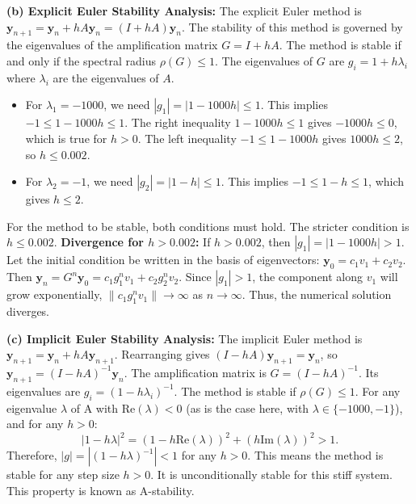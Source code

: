 \begin{solution}
\textbf{(b) Explicit Euler Stability Analysis:}
The explicit Euler method is $\mathbf{y}_{n+1} = \mathbf{y}_n + h A \mathbf{y}_n = (I + hA) \mathbf{y}_n$.
The stability of this method is governed by the eigenvalues of the amplification matrix $G = I + hA$. The method is stable if and only if the spectral radius $\rho(G) \leq 1$.
The eigenvalues of $G$ are $g_i = 1 + h\lambda_i$ where $\lambda_i$ are the eigenvalues of $A$.
\begin{itemize}
    \item For $\lambda_1 = -1000$, we need $|g_1| = |1 - 1000h| \leq 1$. This implies $-1 \leq 1 - 1000h \leq 1$.
    The right inequality $1 - 1000h \leq 1$ gives $-1000h \leq 0$, which is true for $h > 0$.
    The left inequality $-1 \leq 1 - 1000h$ gives $1000h \leq 2$, so $h \leq 0.002$.
    \item For $\lambda_2 = -1$, we need $|g_2| = |1 - h| \leq 1$. This implies $-1 \leq 1 - h \leq 1$, which gives $h \leq 2$.
\end{itemize}
For the method to be stable, both conditions must hold. The stricter condition is $h \leq 0.002$.
\textbf{Divergence for $h > 0.002$:} If $h > 0.002$, then $|g_1| = |1 - 1000h| > 1$. Let the initial condition be written in the basis of eigenvectors: $\mathbf{y}_0 = c_1 v_1 + c_2 v_2$. Then $\mathbf{y}_n = G^n \mathbf{y}_0 = c_1 g_1^n v_1 + c_2 g_2^n v_2$. Since $|g_1| > 1$, the component along $v_1$ will grow exponentially, $\|c_1 g_1^n v_1\| \to \infty$ as $n \to \infty$. Thus, the numerical solution diverges.

\textbf{(c) Implicit Euler Stability Analysis:}
The implicit Euler method is $\mathbf{y}_{n+1} = \mathbf{y}_n + h A \mathbf{y}_{n+1}$.
Rearranging gives $(I - hA)\mathbf{y}_{n+1} = \mathbf{y}_n$, so $\mathbf{y}_{n+1} = (I - hA)^{-1} \mathbf{y}_n$.
The amplification matrix is $G = (I - hA)^{-1}$. Its eigenvalues are $g_i = (1 - h\lambda_i)^{-1}$.
The method is stable if $\rho(G) \leq 1$.
For any eigenvalue $\lambda$ of A with $\text{Re}(\lambda) < 0$ (as is the case here, with $\lambda \in \{-1000, -1\}$), and for any $h > 0$:
\[ |1 - h\lambda|^2 = (1 - h\text{Re}(\lambda))^2 + (h\text{Im}(\lambda))^2 > 1. \]
Therefore, $|g| = |(1 - h\lambda)^{-1}| < 1$ for any $h > 0$.
This means the method is stable for any step size $h>0$. It is unconditionally stable for this stiff system. This property is known as A-stability.


\end{solution}
